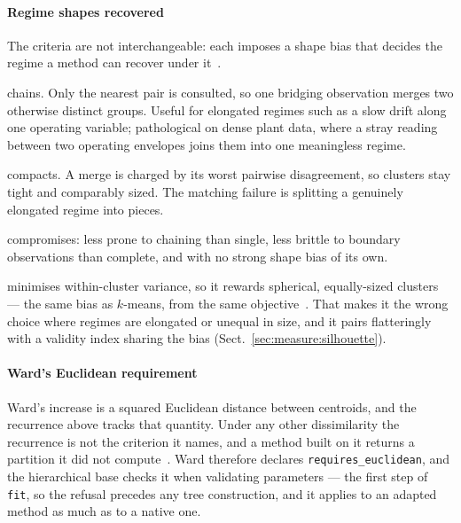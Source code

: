 \paragraph{Regime shapes recovered}
\label{sec:tech:linkage:shapes}
The criteria are not interchangeable: each imposes a shape bias that
decides the regime a method can recover under it~\cite{ref_11}.
\begin{description}[itemsep=2pt,topsep=2pt]
    \item[Single] chains. Only the nearest pair is consulted, so one
    bridging observation merges two otherwise distinct groups. Useful for
    elongated regimes such as a slow drift along one operating variable;
    pathological on dense plant data, where a stray reading between two
    operating envelopes joins them into one meaningless regime.

    \item[Complete] compacts. A merge is charged by its worst pairwise
    disagreement, so clusters stay tight and comparably sized. The
    matching failure is splitting a genuinely elongated regime into
    pieces.

    \item[Average (UPGMA)] compromises: less prone to chaining than
    single, less brittle to boundary observations than complete, and with
    no strong shape bias of its own.

    \item[Ward] minimises within-cluster variance, so it rewards
    spherical, equally-sized clusters --- the same bias as $k$-means, from
    the same objective~\cite{ref_10}. That makes it the wrong choice where
    regimes are elongated or unequal in size, and it pairs flatteringly
    with a validity index sharing the bias
    (Sect.~\ref{sec:measure:silhouette}).
\end{description}

\paragraph{Ward's Euclidean requirement}
\label{sec:tech:linkage:ward}
Ward's increase is a squared Euclidean distance between centroids, and
the recurrence above tracks that quantity. Under any other dissimilarity
the recurrence is not the criterion it names, and a method built on it
returns a partition it did not compute~\cite{ref_28}. Ward therefore
declares \texttt{requires\_euclidean}, and the hierarchical base checks it
when validating parameters --- the first step of \texttt{fit}, so the
refusal precedes any tree construction, and it applies to an adapted
method as much as to a native one.

